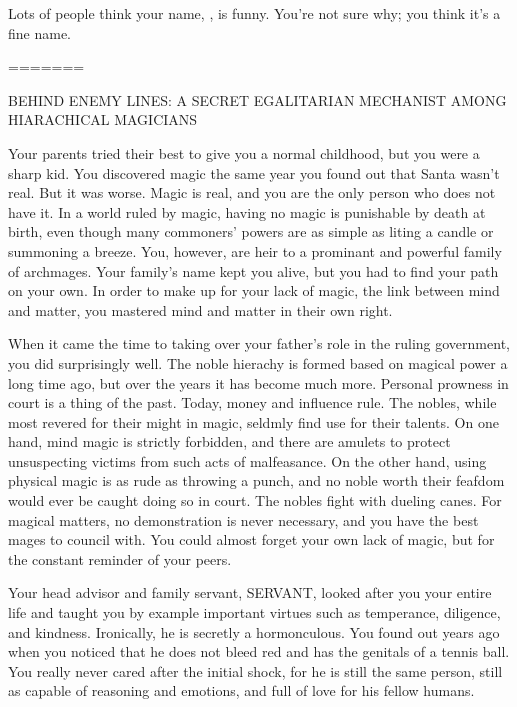 \documentclass[char]{guildcamp3}
\begin{document}
Lots of people think your name, \me{\intro}, is funny.  You're not
sure why; you think it's a fine name.



=======



BEHIND ENEMY LINES: A SECRET EGALITARIAN MECHANIST AMONG HIARACHICAL MAGICIANS

Your parents tried their best to give you a normal childhood, but you were a sharp kid. You discovered magic the same year you found out that Santa wasn't real. But it was worse. Magic is real, and you are the only person who does not have it. In a world ruled by magic, having no magic is punishable by death at birth, even though many commoners' powers are as simple as liting a candle or summoning a breeze. You, however, are heir to a prominant and powerful family of archmages. Your family's name kept you alive, but you had to find your path on your own. In order to make up for your lack of magic, the link between mind and matter, you mastered mind and matter in their own right.

When it came the time to taking over your father's role in the ruling government, you did surprisingly well. The noble hierachy is formed based on magical power a long time ago, but over the years it has become much more. Personal prowness in court is a thing of the past. Today, money and influence rule. The nobles, while most revered for their might in magic, seldmly find use for their talents. On one hand, mind magic is strictly forbidden, and there are amulets to protect unsuspecting victims from such acts of malfeasance. On the other hand, using physical magic is as rude as throwing a punch, and no noble worth their feafdom would ever be caught doing so in court. The nobles fight with dueling canes. For magical matters, no demonstration is never necessary, and you have the best mages to council with. You could almost forget your own lack of magic, but for the constant reminder of your peers.

Your head advisor and family servant, SERVANT, looked after you your entire life and taught you by example important virtues such as temperance, diligence, and kindness. Ironically, he is secretly a hormonculous. You found out years ago when you noticed that he does not bleed red and has the genitals of a tennis ball. You really never cared after the initial shock, for he is still the same person, still as capable of reasoning and emotions, and full of love for his fellow humans.
\end{document}
